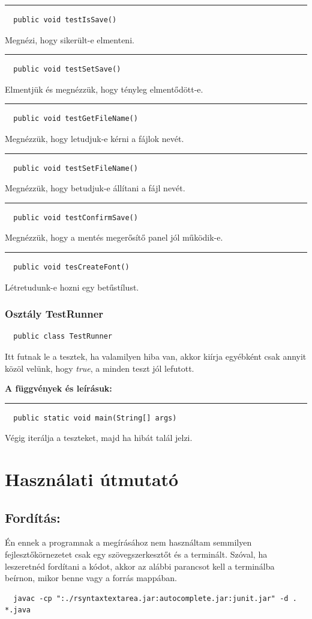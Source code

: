\documentclass[12pt]{article}
\newcommand{\fuggveny}{\textbf{A függvények és leírásuk: \\}}
\newcommand{\vonal}{\noindent\rule{\textwidth}{1pt}}
\begin{document}
\vonal %
\begin{lstlisting}
  public void testIsSave()
\end{lstlisting}
Megnézi, hogy sikerült-e elmenteni.

\vonal %
\begin{lstlisting}
  public void testSetSave()
\end{lstlisting}
Elmentjük és megnézzük, hogy tényleg elmentődött-e.

\vonal %
\begin{lstlisting}
  public void testGetFileName()
\end{lstlisting}
Megnézzük, hogy letudjuk-e kérni a fájlok nevét.

\vonal %
\begin{lstlisting}
  public void testSetFileName()
\end{lstlisting}
Megnézzük, hogy betudjuk-e állítani a fájl nevét.

\newpage
\vonal %
\begin{lstlisting}
  public void testConfirmSave()
\end{lstlisting}
Megnézzük, hogy a mentés megerősítő panel jól működik-e.

\vonal %
\begin{lstlisting}
  public void tesCreateFont()
\end{lstlisting}
Létretudunk-e hozni egy betűstílust.

\subsubsection*{Osztály TestRunner}
\begin{lstlisting}
  public class TestRunner
\end{lstlisting}
Itt futnak le a tesztek, ha valamilyen hiba van, akkor kiírja egyébként csak
annyit közöl velünk, hogy \textit{true}, a minden teszt jól lefutott.

\fuggveny
\vonal
\begin{lstlisting}
  public static void main(String[] args)
\end{lstlisting}
Végig iterálja a teszteket, majd ha hibát talál jelzi.

\newpage
\section*{Használati útmutató}
\subsection*{Fordítás: }
Én ennek a programnak a megírásához nem használtam semmilyen fejlesztőkörnezetet
csak egy szövegszerkesztőt és a terminált. Szóval, ha leszeretnéd fordítani a
kódot, akkor az alábbi parancsot kell a terminálba beírnon, mikor benne vagy a
forrás mappában.
\begin{lstlisting}
  javac -cp ":./rsyntaxtextarea.jar:autocomplete.jar:junit.jar" -d . *.java
\end{lstlisting}
\end{document}

